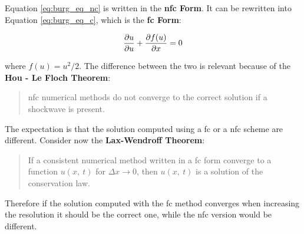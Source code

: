 \documentclass[11pt, a4paper]{article}
\begin{document}
Equation \ref{eq:burg_eq_nc} is written in the
\textbf{\acrfull{nfc} Form}. It can be rewritten into Equation
\ref{eq:burg_eq_c}, which is the \textbf{\acrfull{fc} Form}:

\begin{equation} \label{eq:burg_eq_c}
    \pdv{u}{u} + \pdv{f(u)}{x} = 0
\end{equation}

\noindent
where \(f(u) = u^2 / 2\). The difference between the two is relevant because
of the \textbf{Hou - Le Floch Theorem}:

\begin{quote}
    \acrlong{nfc} numerical methods do not converge to the correct
    solution if a shockwave is present.
\end{quote}

\noindent
The expectation is that the solution computed using a \acrshort{fc} or a
\acrshort{nfc} scheme are different. Consider now the
\textbf{Lax-Wendroff Theorem}:

\begin{quote}
    If a consistent numerical method written in a \acrshort{fc} form
    converge to a function \(u(x,\ t)\) for \(\Delta x \to 0\), then
    \(u(x,\ t)\) is a solution of the conservation law.
\end{quote}

\noindent
Therefore if the solution computed with the \acrshort{fc} method converges when
increasing the resolution it should be the correct one, while the
\acrshort{nfc} version would be different.
\end{document}
